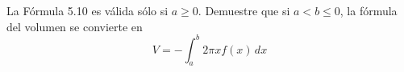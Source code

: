 \item La Fórmula 5.10 es válida sólo si $a \ge 0$. Demuestre que si $a < b \le 0$, la fórmula del volumen se convierte en
$$V = -\int_a^b 2\pi x f(x) \, dx$$
